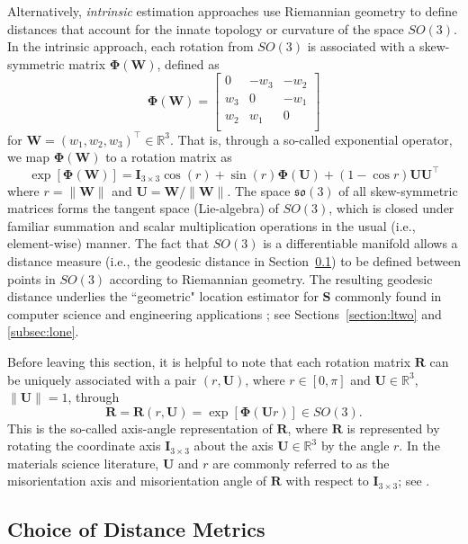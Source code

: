 Alternatively, \textit{intrinsic} estimation approaches use Riemannian geometry to define distances that account for the innate topology or curvature of the space $SO(3)$.  In the intrinsic approach, each rotation from $SO(3)$ is
associated with a skew-symmetric matrix $\bm{\Phi}(\bm{W})$, defined  as
\[
  \bm{\Phi}(\bm{W}) = \left[ \begin{array}{ccc} 0 & -w_3 & -w_2\\
  w_3 & 0 & -w_1\\
  w_2 & w_1 & 0\\
  \end{array}
 \right]
\]
for $\bm{W}=(w_1, w_2, w_3)^\top \in \mathbb{R}^3$. That is, through a so-called exponential operator,
we map  $\bm{\Phi}(\bm{W})$ to a rotation matrix as
\[
  \exp[\bm{\Phi}(\bm{W})] = \bm{I}_{3\times3}\cos(r) + \sin(r) \bm{\Phi}(\bm{U}) + (1-\cos r) \bm{U} \bm{U}^\top
\]
where $r=\|\bm{W}\|$ and $\bm{U} =\bm{W}/\|\bm{W}\| $.  The space $\mathfrak{so}(3)$ of all skew-symmetric matrices forms the tangent space (Lie-algebra) of $SO(3)$,
which is closed under familiar summation and scalar multiplication operations in the usual (i.e., element-wise) manner. The fact that $SO(3)$ is a differentiable manifold allows a distance measure (i.e., the geodesic distance in Section~\ref{subsec:metrics}) to be defined between points in $SO(3)$ according to Riemannian geometry. The resulting geodesic distance underlies the ``geometric" location estimator for $\bm{S}$ commonly found in computer science \citep{fletcher08, fletcher09, hartley11} and engineering applications \citep{manton04}; see Sections~\ref{section:ltwo} and \ref{subsec:lone}.

Before leaving this section, it is helpful to note that each rotation matrix $\bm{R}$ can be uniquely associated with a
pair $(r,\bm{U})$, where $r\in[0,\pi]$ and $\bm{U}\in\mathbb{R}^3$, $\|\bm{U}\|=1$, through
\begin{equation}
\label{eqn:angleaxis}
 \bm{R} = \bm{R}(r,\bm{U}) = \exp[\bm\Phi(\bm{U} r)] \in SO(3).
\end{equation}
This is the so-called axis-angle representation of $\bm{R}$, where $\bm{R}$ is represented by rotating the coordinate axis $\bm{I}_{3 \times 3}$ about the axis $\bm{U}\in\mathbb{R}^3$ by the angle $r$. In the materials science literature,
$\bm{U}$ and $r$ are commonly referred to as the misorientation axis and misorientation angle of $\bm R$ with respect to  $\bm{I}_{3 \times 3}$; see \cite{randle03}.


\subsection{Choice of Distance Metrics}\label{subsec:metrics}

